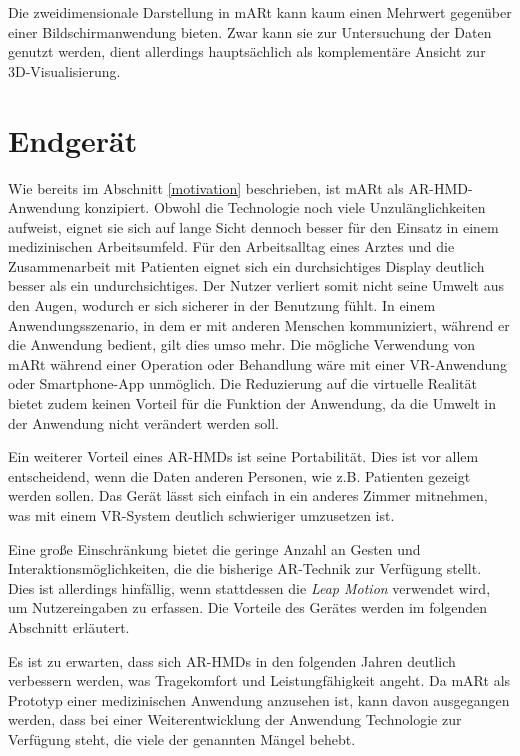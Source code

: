 Die zweidimensionale Darstellung in mARt kann kaum einen Mehrwert gegenüber einer Bildschirmanwendung  bieten. Zwar kann sie zur Untersuchung der Daten genutzt werden, dient allerdings hauptsächlich als komplementäre Ansicht zur 3D-Visualisierung.

\section{Endgerät}
\label{device}

Wie bereits im Abschnitt \ref{motivation} beschrieben, ist mARt als AR-HMD-Anwendung konzipiert. Obwohl die Technologie noch viele Unzulänglichkeiten aufweist, eignet sie sich auf lange Sicht dennoch besser für den Einsatz in einem medizinischen Arbeitsumfeld.
Für den Arbeitsalltag eines Arztes und die Zusammenarbeit mit Patienten eignet sich ein durchsichtiges Display deutlich besser als ein undurchsichtiges. Der Nutzer verliert somit nicht seine Umwelt aus den Augen, wodurch er sich sicherer in der Benutzung fühlt. In einem Anwendungsszenario, in dem er mit anderen Menschen kommuniziert, während er die Anwendung bedient, gilt dies umso mehr. Die mögliche Verwendung von mARt während einer Operation oder Behandlung wäre mit einer VR-Anwendung oder Smartphone-App unmöglich. Die Reduzierung auf die virtuelle Realität bietet zudem keinen Vorteil für die Funktion der Anwendung, da die Umwelt in der Anwendung nicht verändert werden soll. 

Ein weiterer Vorteil eines AR-HMDs ist seine Portabilität. Dies ist vor allem entscheidend, wenn die Daten anderen Personen, wie z.B. Patienten gezeigt werden sollen. Das Gerät lässt sich einfach in ein anderes Zimmer mitnehmen, was mit einem VR-System deutlich schwieriger umzusetzen ist.
 
Eine große Einschränkung bietet die geringe Anzahl an Gesten und Interaktionsmöglichkeiten, die die bisherige AR-Technik zur Verfügung stellt. Dies ist allerdings hinfällig, wenn stattdessen die \textit{Leap Motion} verwendet wird, um Nutzereingaben zu erfassen. Die Vorteile des Gerätes werden im folgenden Abschnitt erläutert.

Es ist zu erwarten, dass sich AR-HMDs in den folgenden Jahren deutlich verbessern werden, was Tragekomfort und Leistungfähigkeit angeht. Da mARt als Prototyp einer medizinischen Anwendung anzusehen ist, kann davon ausgegangen werden, dass bei einer Weiterentwicklung der Anwendung Technologie zur Verfügung steht, die viele der genannten Mängel behebt.

